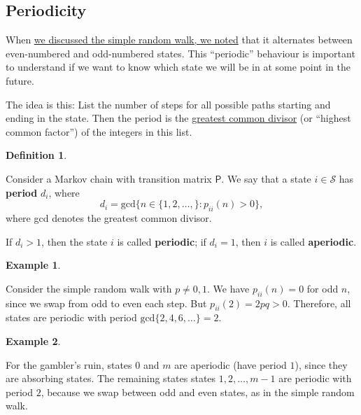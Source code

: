 \documentclass[
  a4paper,
]{article}
\theoremstyle{definition}
\newtheorem{definition}{Definition}[section]
\theoremstyle{definition}
\newtheorem{example}{Example}[section]
\theoremstyle{definition}
\theoremstyle{remark}
\begin{document}
\hypertarget{periodicity}{%
\subsection{Periodicity}\label{periodicity}}

When \protect\hyperlink{S02-exact-distribution}{we discussed the simple random walk, we noted} that it alternates between even-numbered and odd-numbered states. This ``periodic'' behaviour is important to understand if we want to know which state we will be in at some point in the future.

The idea is this: List the number of steps for all possible paths starting and ending in the state. Then the period is the \href{https://en.wikipedia.org/wiki/Greatest_common_divisor}{greatest common divisor} (or ``highest common factor'') of the integers in this list.

\begin{definition}
\protect\hypertarget{def:period}{}\label{def:period}

Consider a Markov chain with transition matrix \(\mathsf P\). We say that a state \(i\in\mathcal{S}\) has \textbf{period} \(d_i\), where
\[ d_i=\text{gcd}\big\{n\in\{1,2,\dots,\} : p_{ii}(n) > 0\big\} , \]
where gcd denotes the greatest common divisor.

If \(d_i>1\), then the state \(i\) is called \textbf{periodic}; if \(d_i = 1\), then \(i\) is called \textbf{aperiodic}.

\end{definition}

\begin{example}
\protect\hypertarget{exm:rw-period}{}\label{exm:rw-period}

Consider the simple random walk with \(p \neq 0,1\). We have \(p_{ii}(n) = 0\) for odd \(n\), since we swap from odd to even each step. But \(p_{ii}(2) = 2pq > 0\). Therefore, all states are periodic with period \(\text{gcd}\{2,4,6,\dots\} = 2\).

\end{example}

\begin{example}
\protect\hypertarget{exm:gamblers-period}{}\label{exm:gamblers-period}

For the gambler's ruin, states \(0\) and \(m\) are aperiodic (have period \(1\)), since they are absorbing states. The remaining states states \(1,2,\dots,m-1\) are periodic with period \(2\), because we swap between odd and even states, as in the simple random walk.

\end{example}
\end{document}
